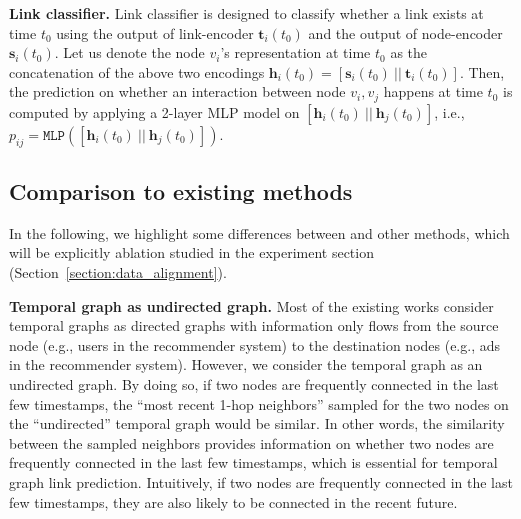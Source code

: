 \noindent\textbf{Link classifier.} 
Link classifier is designed to classify whether a link exists at time $t_0$ using the output of link-encoder $\mathbf{t}_i(t_0)$ and the output of node-encoder $\mathbf{s}_i(t_0)$.
Let us denote the node $v_i$'s representation at time $t_0$ as the concatenation of the above two encodings $\mathbf{h}_i(t_0) = [\mathbf{s}_i(t_0)~||~\mathbf{t}_i(t_0)]$.
Then, the prediction on whether an interaction between node $v_i,v_j$ happens at time $t_0$ is computed by applying a 2-layer MLP model on $[\mathbf{h}_i(t_0)~||~\mathbf{h}_j(t_0)]$, i.e., $p_{ij} = \texttt{MLP}([\mathbf{h}_i(t_0)~||~\mathbf{h}_j(t_0)])$.

\subsection{Comparison to existing methods} \label{section:some_differences}

In the following, we highlight some differences between \our and other methods, which will be explicitly ablation studied in the experiment section (Section~\ref{section:data_alignment}). 

\noindent\textbf{Temporal graph as undirected graph.}
Most of the existing works consider temporal graphs as directed graphs with information only flows from the source node (e.g., users in the recommender system) to the destination nodes (e.g., ads in the recommender system). However, we consider the temporal graph as an undirected graph.
By doing so, if two nodes are frequently connected in the last few timestamps, the ``most recent 1-hop neighbors'' sampled for the two nodes on the ``undirected'' temporal graph would be similar.
In other words, the similarity between the sampled neighbors provides information on whether two nodes are frequently connected in the last few timestamps, which is essential for temporal graph link prediction. Intuitively, if two nodes are frequently connected in the last few timestamps, they are also likely to be connected in the recent future.

